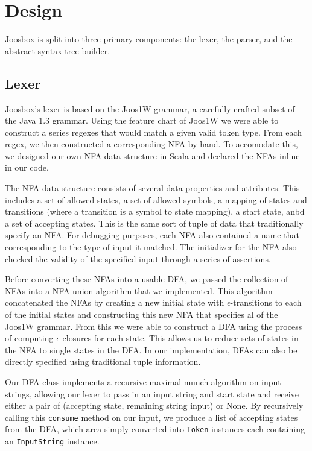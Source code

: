 \documentclass[letterpaper]{article}
\begin{document}
  \section{Design}

  Joosbox is split into three primary components: the lexer, the parser, and the
  abstract syntax tree builder.

  \subsection{Lexer}

  Joosbox's lexer is based on the Joos1W grammar, a carefully crafted subset of
  the Java 1.3 grammar. Using the feature chart of Joos1W we were able to
  construct a series regexes that would match a given valid token type. From
  each regex, we then constructed a corresponding NFA by hand. To accomodate
  this, we designed our own NFA data structure in Scala and declared the NFAs
  inline in our code.

  The NFA data structure consists of several data properties and attributes.
  This includes a set of allowed states, a set of allowed symbols, a mapping
  of states and transitions (where a transition is a symbol to state mapping),
  a start state, anbd a set of accepting states. This is the same sort of tuple
  of data that traditionally specify an NFA. For debugging purposes, each NFA
  also contained a name that corresponding to the type of input it matched. The
  initializer for the NFA also checked the validity of the specified input
  through a series of assertions.

  Before converting these NFAs into a usable DFA, we passed the collection of
  NFAs into a NFA-union algorithm that we implemented. This algorithm
  concatenated the NFAs by creating a new initial state with
  $\epsilon$-transitions to each of the initial states and constructing this
  new NFA that specifies al of the Joos1W grammar. From this we were able to
  construct a DFA using the process of computing $\epsilon$-closures for each
  state. This allows us to reduce sets of states in the NFA to single states in
  the DFA. In our implementation, DFAs can also be directly specified using
  traditional tuple information.

  Our DFA class implements a recursive maximal munch algorithm on input
  strings, allowing our lexer to pass in an input string and start state and
  receive either a pair of (accepting state, remaining string input) or None.
  By recursively calling this {\tt consume} method on our input, we produce
  a list of accepting states from the DFA, which area simply converted into
  {\tt Token} instances each containing an {\tt InputString} instance.
\end{document}

